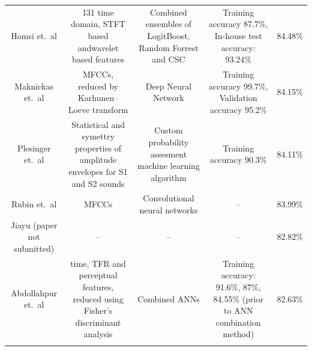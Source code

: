 \documentclass[titlepage, 12pt]{scrartcl} \usepackage{enumitem}
\newcommand{\dbottomrule}{\specialrule{1pt}{0pt}{1.4pt}%
            \specialrule{1pt}{0pt}{\belowrulesep}%
            }
\begin{document}
\begin{landscape}
\begin{table}[H]
\begin{tabulary}{\linewidth}{CCCCC}
Homsi et.~al \citeyearpar{Homsi2017}             & 131 time domain, STFT based andwavelet based features                           & Combined ensembles of LogitBoost, Random Forrest and CSC & Training accuracy 87.7\%, In-house test accuracy: 93.24\%                                            & 84.48\%         \\
Maknickas et.~al \citeyearpar{Maknikas2017}      & MFCCs, reduced by Karhunen–Loeve transform                                      & Deep Neural Network                                      & Training accuracy 99.7\%, Validation accuracy 95.2\%                                                 & 84.15\%         \\
Plesinger et.~al \citeyearpar{Plesinger2017}     & Statistical and symettry properties of amplitude envelopes for S1 and S2 sounds & Custom probability assesment machine learning algorithm  & Training accuracy 90.3\%                                                                             & 84.11\%         \\
Rubin et.~al \citeyearpar{Rubin2016}             & MFCCs                                                                           & Convolutional neural networks                            & --                                                                                                   & 83.99\%         \\
Jiayu (paper not submitted)                      & --                                                                              & --                                                       & --                                                                                                   & 82.82\%         \\
Abdollahpur et.~al \citeyearpar{Abdolahpur2017} & time, TFR and perceptual features, reduced using Fisher's discriminant analysis & Combined ANNs                                            & Training accuracy: 91.6\%, 87\%, 84.55\% (prior to ANN combination method)                           & 82.63\%\\
\dbottomrule\\

\end{tabulary}
\end{table}
\end{landscape}
\restoregeometry
\doublespacing
\end{document}
